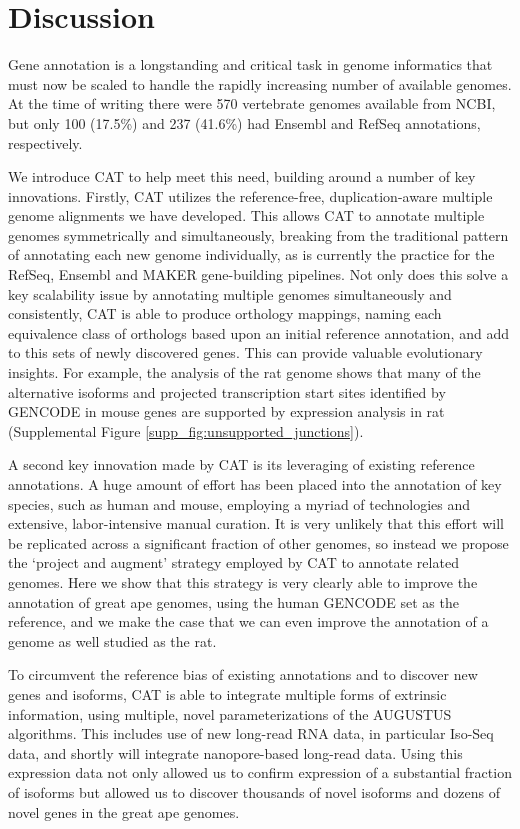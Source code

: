 \documentclass[fleqn,10pt]{wlscirep}
\begin{document}
\section*{Discussion}

Gene annotation is a longstanding and critical task in genome informatics that must now be scaled to handle the rapidly increasing number of available genomes. At the time of writing there were 570 vertebrate genomes available from NCBI, but only 100 (17.5\%) and 237 (41.6\%) had Ensembl and RefSeq annotations, respectively.

We introduce CAT to help meet this need, building around a number of key innovations. 
Firstly, CAT utilizes the reference-free, duplication-aware multiple genome alignments we have developed. This allows CAT to annotate multiple genomes symmetrically and simultaneously, breaking from the traditional pattern of annotating each new genome individually, as is currently the practice for the RefSeq, Ensembl and MAKER gene-building pipelines.
Not only does this solve a key scalability issue 
by annotating multiple genomes simultaneously and consistently, CAT is able to produce orthology mappings, naming each equivalence class of orthologs based upon an initial reference annotation, and add to this sets of newly discovered genes. This can provide valuable evolutionary insights. For example, the analysis of the rat genome shows that many of the alternative isoforms and projected transcription start sites identified by GENCODE in mouse genes are supported by expression analysis in rat (Supplemental Figure \ref{supp_fig:unsupported_junctions}).

A second key innovation made by CAT is its leveraging of existing reference annotations. A huge amount of effort has been placed into the annotation of key species, such as human and mouse, employing a myriad of technologies and extensive, labor-intensive manual curation. It is very unlikely that this effort will be replicated across a significant fraction of other genomes, so instead we propose the `project and augment' strategy employed by CAT to annotate related genomes. Here we show that this strategy is very clearly able to improve the annotation of great ape genomes, using the human GENCODE set as the reference, and we make the case that we can even improve the annotation of a genome as well studied as the rat. 

To circumvent the reference bias of existing annotations and to discover new genes and isoforms, CAT is able to integrate multiple forms of extrinsic information, using multiple, novel parameterizations of the AUGUSTUS algorithms. This includes use of new long-read RNA data, in particular Iso-Seq data, and shortly will integrate nanopore-based long-read data\cite{byrne2017nanopore}. Using this expression data not only allowed us to confirm expression of a substantial fraction of isoforms but allowed us to discover thousands of novel isoforms and dozens of novel genes in the great ape genomes.
\end{document}
